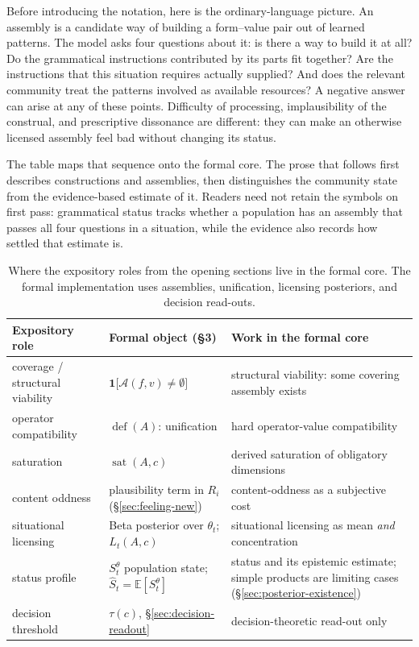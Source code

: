 Before introducing the notation, here is the ordinary-language picture. An
assembly is a candidate way of building a form--value pair out of learned
patterns. The model asks four questions about it: is there a way to build it at
all? Do the grammatical instructions contributed by its parts fit together? Are
the instructions that this situation requires actually supplied? And does the
relevant community treat the patterns involved as available resources? A
negative answer can arise at any of these points. Difficulty of processing,
implausibility of the construal, and prescriptive dissonance are different: they
can make an otherwise licensed assembly feel bad without changing its status.

The table maps that sequence onto the formal core. The prose that follows first
describes constructions and assemblies, then distinguishes the community state
from the evidence-based estimate of it. Readers need not retain the symbols on
first pass: grammatical status tracks whether a population has an assembly that
passes all four questions in a situation, while the evidence also records how
settled that estimate is.

\begin{table}[htbp]
\centering
\small
\begin{tabular}{@{}>{\raggedright\arraybackslash}p{}
  >{\raggedright\arraybackslash}p{}
  >{\raggedright\arraybackslash}p{}@{}}
\toprule
Expository role & Formal object (\S3) & Work in the formal core \\
\midrule
coverage / structural viability & $\mathbf{1}\bigl[\mathcal{A}(f,v)\neq\emptyset\bigr]$ &
  structural viability: some covering assembly exists \\
operator compatibility & $\operatorname{def}(A)$: unification &
  hard operator-value compatibility \\
saturation & $\operatorname{sat}(A,c)$ &
  derived saturation of obligatory dimensions \\
content oddness & plausibility term in $R_i$ (\S\ref{sec:feeling-new}) &
  content-oddness as a subjective cost \\
situational licensing & Beta posterior over $\theta_t$; $L_t(A,c)$ &
  situational licensing as mean \emph{and} concentration \\
status profile & $S_t^{\theta}$ population state;
  $\widehat{S}_t=\mathbb{E}[S_t^{\theta}]$ &
  status and its epistemic estimate; simple products are limiting cases
  (\S\ref{sec:posterior-existence}) \\
decision threshold & $\tau(c)$, \S\ref{sec:decision-readout} & decision-theoretic read-out only \\
\bottomrule
\end{tabular}
\caption{Where the expository roles from the opening sections live in the formal core. The formal implementation uses assemblies, unification, licensing posteriors, and decision read-outs.}
\label{tab:notation-bridge}
\end{table}

